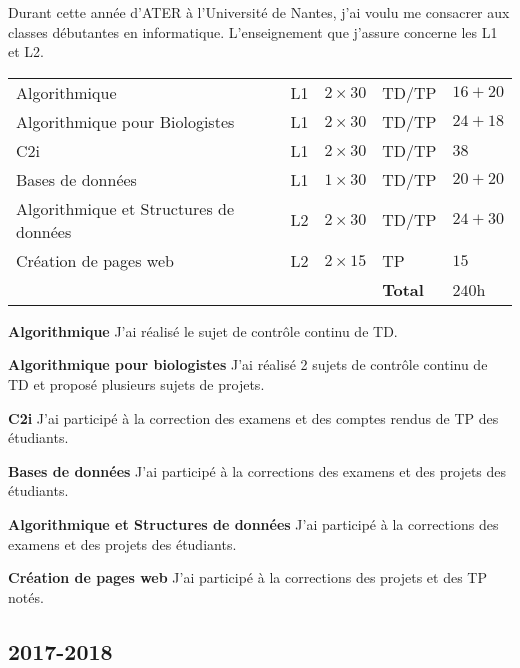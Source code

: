 Durant cette année d'ATER à l'Université de Nantes, j'ai voulu me consacrer aux classes débutantes en informatique. L'enseignement que j'assure concerne les L1 et L2.

\begin{tabular}{m{6cm}||m{1.3cm}m{1.5cm}m{2cm}m{3cm}} 
\hline
Algorithmique                            & L1 & $2\times30$ & TD/TP & $16 + 20$ \\
Algorithmique pour Biologistes           & L1 & $2\times30$ & TD/TP & $24 + 18$ \\
C2i                                      & L1 & $2\times30$ & TD/TP & $38$ \\
Bases de données                         & L1 & $1\times30$ & TD/TP & $20 + 20$ \\ 
Algorithmique et Structures de données   & L2 & $2\times30$ & TD/TP & $24+30$ \\
Création de pages web                    & L2 & $2\times15$ & TP & $15$ \\
\cline{4-5}
                                         & & & {\bf Total} & $240$h \\
\hline
\end{tabular} 

{\bf Algorithmique} J'ai réalisé le sujet de contrôle continu de TD.

{\bf Algorithmique pour biologistes} J'ai réalisé 2 sujets de contrôle continu de TD et proposé plusieurs sujets de projets.

{\bf C2i} J'ai participé à la correction des examens et des comptes rendus de TP des étudiants. 

{\bf Bases de données} J'ai participé à la corrections des examens et des projets des étudiants.

{\bf Algorithmique et Structures de données} J'ai participé à la corrections des examens et des projets des étudiants.

{\bf Création de pages web} J'ai participé à la corrections des projets et des TP notés.

\subsection{2017-2018}

